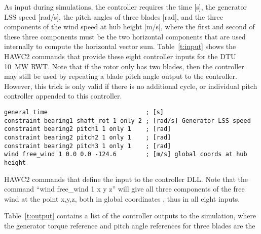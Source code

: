 As input during simulations, the controller requires the time [s], the generator LSS speed [rad/s], the pitch angles of three blades [rad], and the three components of the wind speed at hub height [m/s], where the first and second of these three components must be the two horizontal components that are used internally to compute the horizontal vector sum. Table~\ref{t:input} shows the HAWC2 commands that provide these eight controller inputs for the DTU 10~MW RWT. Note that if the rotor only has two blades, then the controller may still be used by repeating a blade pitch angle output to the controller. However, this trick is only valid if there is no additional cycle, or individual pitch controller appended to this controller.

\begin{table}[b]
\center
\begin{verbatim}
general time                           ; [s]
constraint bearing1 shaft_rot 1 only 2 ; [rad/s] Generator LSS speed
constraint bearing2 pitch1 1 only 1    ; [rad]
constraint bearing2 pitch2 1 only 1    ; [rad]
constraint bearing2 pitch3 1 only 1    ; [rad]
wind free_wind 1 0.0 0.0 -124.6        ; [m/s] global coords at hub height
\end{verbatim}
\caption{HAWC2 commands that define the input to the controller DLL. Note that the command ``wind free\_wind 1 x y z'' will give all three components of the free wind at the point x,y,z, both in global coordinates \cite{Larsen12}, thus in all eight inputs. \label{t:input}}
\end{table}

Table~\ref{t:output} contains a list of the controller outputs to the simulation, where the generator torque reference and pitch angle references for three blades are the 


